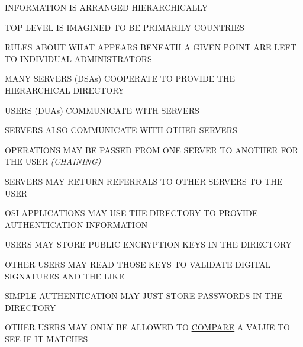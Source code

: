 \begin{bwslide}

\begin{nrtc}
\item	INFORMATION IS ARRANGED HIERARCHICALLY
\item	TOP LEVEL IS IMAGINED TO BE PRIMARILY COUNTRIES
\item	RULES ABOUT WHAT APPEARS BENEATH A GIVEN POINT
	ARE LEFT TO INDIVIDUAL ADMINISTRATORS
\end{nrtc}
\end{bwslide}




\begin{bwslide}

\begin{nrtc}
\item	MANY SERVERS (DSAs) COOPERATE TO PROVIDE THE HIERARCHICAL DIRECTORY
\item	USERS (DUAs) COMMUNICATE WITH SERVERS
\item	SERVERS ALSO COMMUNICATE WITH OTHER SERVERS
\item	OPERATIONS MAY BE PASSED FROM ONE SERVER TO ANOTHER FOR THE USER {\em (CHAINING)}
\item	SERVERS MAY RETURN REFERRALS TO OTHER SERVERS TO THE USER
\end{nrtc}
\end{bwslide}




\begin{bwslide}

\begin{nrtc}
\item	OSI APPLICATIONS MAY USE THE DIRECTORY TO PROVIDE AUTHENTICATION INFORMATION
\item	USERS MAY STORE PUBLIC ENCRYPTION KEYS IN THE DIRECTORY
\item	OTHER USERS MAY READ THOSE KEYS TO VALIDATE DIGITAL SIGNATURES AND THE LIKE
\end{nrtc}
\begin{nrtc}
\item	SIMPLE AUTHENTICATION MAY JUST STORE PASSWORDS IN THE DIRECTORY
\item	OTHER USERS MAY ONLY BE ALLOWED TO \underline{COMPARE} A VALUE TO 
		SEE IF IT MATCHES	
\end{nrtc}
\end{bwslide}



